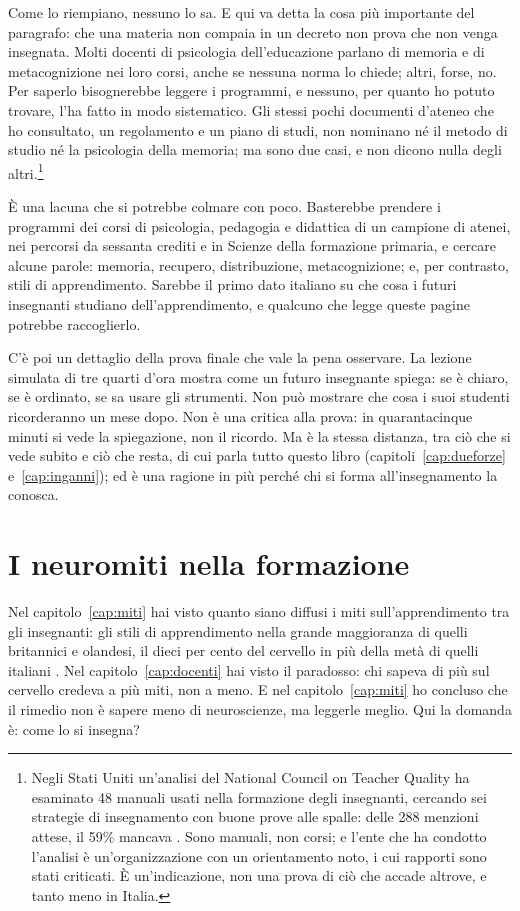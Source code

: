 Come lo riempiano, nessuno lo sa. E qui va detta la cosa più
importante del paragrafo: che una materia non compaia in un decreto
non prova che non venga insegnata. Molti docenti di psicologia
dell'educazione parlano di memoria e di metacognizione nei loro corsi,
anche se nessuna norma lo chiede; altri, forse, no. Per saperlo
bisognerebbe leggere i programmi, e nessuno, per quanto ho potuto
trovare, l'ha fatto in modo sistematico. Gli stessi pochi documenti
d'ateneo che ho consultato, un regolamento e un piano di studi, non
nominano né il metodo di studio né la psicologia della memoria; ma
sono due casi, e non dicono nulla degli altri.\footnote{Negli Stati
Uniti un'analisi del National Council on Teacher Quality ha esaminato
48 manuali usati nella formazione degli insegnanti, cercando sei
strategie di insegnamento con buone prove alle spalle: delle 288
menzioni attese, il 59\% mancava \parencite{pomerance2016}. Sono
manuali, non corsi; e l'ente che ha condotto l'analisi è
un'organizzazione con un orientamento noto, i cui rapporti sono stati
criticati. È un'indicazione, non una prova di ciò che accade altrove,
e tanto meno in Italia.}

È una lacuna che si potrebbe colmare con poco. Basterebbe prendere i
programmi dei corsi di psicologia, pedagogia e didattica di un
campione di atenei, nei percorsi da sessanta crediti e in Scienze della
formazione primaria, e cercare alcune parole: memoria, recupero,
distribuzione, metacognizione; e, per contrasto, stili di
apprendimento. Sarebbe il primo dato italiano su che cosa i futuri
insegnanti studiano dell'apprendimento, e qualcuno che legge queste
pagine potrebbe raccoglierlo.

C'è poi un dettaglio della prova finale che vale la pena osservare. La
lezione simulata di tre quarti d'ora mostra come un futuro insegnante
spiega: se è chiaro, se è ordinato, se sa usare gli strumenti. Non può
mostrare che cosa i suoi studenti ricorderanno un mese dopo. Non è una
critica alla prova: in quarantacinque minuti si vede la spiegazione,
non il ricordo. Ma è la stessa distanza, tra ciò che si vede subito e
ciò che resta, di cui parla tutto questo libro (capitoli~\ref{cap:dueforze}
e~\ref{cap:inganni}); ed è una ragione in più perché chi si forma
all'insegnamento la conosca.

\section{I neuromiti nella formazione}

Nel capitolo~\ref{cap:miti} hai visto quanto siano diffusi i miti
sull'apprendimento tra gli insegnanti: gli stili di apprendimento
nella grande maggioranza di quelli britannici e olandesi, il dieci per
cento del cervello in più della metà di quelli italiani
\parencite{dekker2012,bei2023}. Nel capitolo~\ref{cap:docenti} hai
visto il paradosso: chi sapeva di più sul cervello credeva a più
miti, non a meno. E nel capitolo~\ref{cap:miti} ho concluso che il
rimedio non è sapere meno di neuroscienze, ma leggerle meglio. Qui
la domanda è: come lo si insegna?

